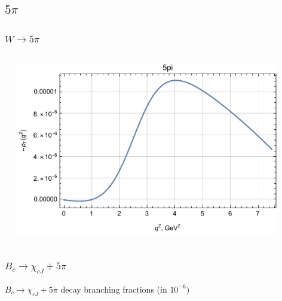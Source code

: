 \documentclass{beamer}
\begin{document}
\subsection{$5\pi$}
\begin{frame}
  \frametitle{$W \to  5\pi$}
  \begin{columns}
    \begin{column}{0.5\textwidth}
    \end{column}
    \begin{column}{0.5\textwidth}
  \includegraphics[width=0.9\textwidth]{figs/rhoT_5pi_q2}
    \end{column}
  \end{columns}
\end{frame}


\begin{frame}
  \frametitle{$B_c \to \chi_{cJ} + 5\pi$}
  
$B_c \to \chi_{cJ} + 5\pi$ decay branching fractions (in $10^{-6}$) 


\end{frame}
\end{document}
